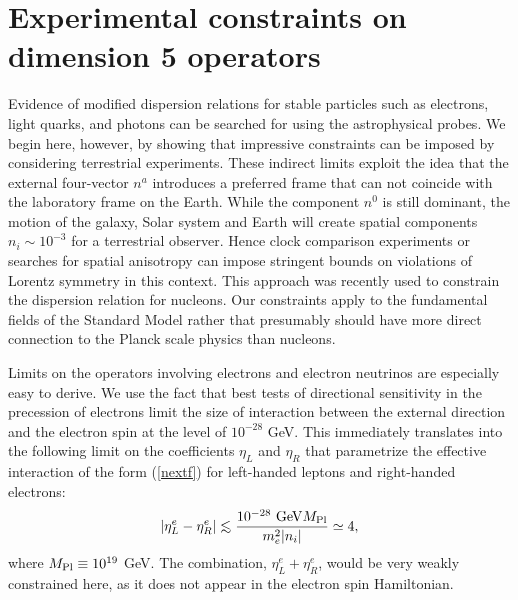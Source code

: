 \documentclass[12pt]{article}
\newcommand{\fr}[2]{\frac{#1}{#2}}
\newcommand{\la}{\lambda}
\newcommand{\be}{\begin{equation}}
\newcommand{\ee}{\end{equation}}
\def\la{\mathrel{\raise.3ex\hbox{$<$\kern-.75em\lower1ex\hbox{$\sim$}}}}
\newcommand{\reef}[1]{(\ref{#1})}
\newcommand{\mpl}{M_{\rm {\small Pl}}}
\begin{document}
\section{Experimental constraints on dimension 5 operators}

Evidence of modified dispersion relations for stable particles
such as electrons, light quarks, and photons can be searched for
using the astrophysical probes\cite{mass,rot,Jacob,wow,wow2}. We
begin here, however, by showing that impressive constraints can be
imposed by considering terrestrial experiments. These indirect
limits exploit the idea that the external four-vector $n^a$
introduces a preferred frame that can not coincide with the
laboratory frame on the Earth\cite{nuCPT}. While the component
$n^0$ is still dominant, the motion of the galaxy, Solar system
and Earth will create spatial components $n_i \sim 10^{-3}$ for a
terrestrial observer. Hence clock comparison
experiments\cite{clocks} or searches for spatial
anisotropy\cite{Heckel} can impose stringent bounds on violations
of Lorentz symmetry in this context. This approach was recently
used to constrain the dispersion relation for nucleons\cite{Vuc}.
Our constraints\cite{prl} apply to the fundamental fields of the
Standard Model rather that presumably should have more direct
connection to the Planck scale physics than nucleons.

Limits on the operators involving electrons and electron neutrinos
are especially easy to derive. We use the fact that best
tests\cite{Heckel} of directional sensitivity in the precession of
electrons limit the size of interaction between the external
direction and the electron spin at the level of $10^{-28}$ GeV.
This immediately translates into the following limit on the
coefficients $\eta_L$ and $\eta_R$ that parametrize the effective
interaction of the form \reef{nextf} for left-handed leptons and
right-handed electrons\cite{prl}:
%
\be |\eta_L^e-\eta_R^e|\la \fr{10^{-28}~{\rm
GeV}\mpl}{m_e^2|n_i|}\simeq 4, \label{leptl} \ee
%
where $\mpl \equiv 10^{19}$ GeV. The combination,
$\eta_L^e+\eta_R^e$, would be very weakly constrained here, as it
does not appear in the electron spin Hamiltonian.
\end{document}
